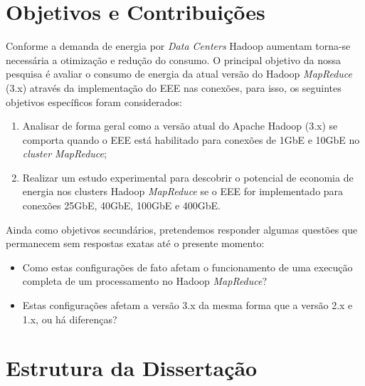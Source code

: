 
\section{Objetivos e Contribuições}

Conforme a demanda de energia por \emph{Data Centers} Hadoop aumentam torna-se necessária a otimização e redução do consumo. O principal objetivo da nossa pesquisa é avaliar o consumo de energia da atual versão do Hadoop \emph{MapReduce} (3.x) através da implementação do EEE nas conexões, para isso, os seguintes objetivos específicos foram considerados:

\begin{enumerate}

\item Analisar de forma geral como a versão atual do Apache Hadoop (3.x) se comporta quando o EEE está habilitado para conexões de 1GbE e 10GbE no \emph{cluster MapReduce};

\item Realizar um estudo experimental para descobrir o potencial de economia de energia nos clusters Hadoop \emph{MapReduce} se o EEE for implementado para conexões 25GbE, 40GbE, 100GbE e 400GbE.

\end{enumerate}

Ainda como objetivos secundários, pretendemos responder algumas questões que permanecem sem respostas exatas até o presente momento:

\begin{itemize}

    \item Como estas configurações de fato afetam o funcionamento de uma execução completa de um processamento no Hadoop \emph{MapReduce}?
    
    \item Estas configurações afetam a versão 3.x da mesma forma que a versão 2.x e 1.x, ou há diferenças?
    
\end{itemize}

\section{Estrutura da Dissertação}

